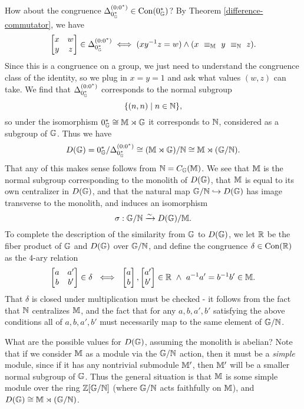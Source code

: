 \documentclass[letterpaper,11pt]{article}
\DeclareMathOperator{\Con}{Con}
\begin{document}
\begin{ex}
How about the congruence $\Delta_{0_\bG^*}^{(0:0^*)} \in \Con(0_\bG^*)$? By Theorem \ref{difference-commutator}, we have
\[
\begin{bmatrix} x & w\\ y & z\end{bmatrix} \in \Delta_{0_{\mathbb{G}}^*}^{(0:0^*)} \iff (xy^{-1}z = w) \wedge (x\ \equiv_{\mathbb{M}}\ y\ \equiv_{\mathbb{N}}\ z).
\]
Since this is a congruence on a group, we just need to understand the congruence class of the identity, so we plug in $x = y = 1$ and ask what values $(w,z)$ can take. We find that $\Delta_{0_{\mathbb{G}}^*}^{(0:0^*)}$ corresponds to the normal subgroup
\[
\{(n,n) \mid n \in \mathbb{N}\},
\]
so under the isomorphism $0_{\mathbb{G}}^* \cong \mathbb{M} \rtimes \mathbb{G}$ it corresponds to $\mathbb{N}$, considered as a subgroup of $\mathbb{G}$. Thus we have
\[
D(\mathbb{G}) = 0_{\mathbb{G}}^*/\Delta_{0_{\mathbb{G}}^*}^{(0:0^*)} \cong (\mathbb{M} \rtimes \mathbb{G})/\mathbb{N} \cong \mathbb{M} \rtimes (\mathbb{G}/\mathbb{N}).
\]
That any of this makes sense follows from $\mathbb{N} = C_{\mathbb{G}}(\mathbb{M})$. We see that $\mathbb{M}$ is the normal subgroup corresponding to the monolith of $D(\mathbb{G})$, that $\mathbb{M}$ is equal to its own centralizer in $D(\mathbb{G})$, and that the natural map $\mathbb{G}/\mathbb{N} \hookrightarrow D(\mathbb{G})$ has image transverse to the monolith, and induces an isomorphism
\[
\sigma : \mathbb{G}/\mathbb{N} \xrightarrow{\sim} D(\mathbb{G})/\mathbb{M}.
\]
To complete the description of the similarity from $\mathbb{G}$ to $D(\mathbb{G})$, we let $\mathbb{R}$ be the fiber product of $\mathbb{G}$ and $D(\mathbb{G})$ over $\mathbb{G}/\mathbb{N}$, and define the congruence $\delta \in \Con(\RR)$ as the $4$-ary relation
\[
\begin{bmatrix} a & a'\\ b & b'\end{bmatrix} \in \delta\ \iff\ \begin{bmatrix} a\\ b \end{bmatrix}, \begin{bmatrix} a'\\ b'\end{bmatrix} \in \RR\ \wedge\ a^{-1}a' = b^{-1}b' \in \bM.
\]
That $\delta$ is closed under multiplication must be checked - it follows from the fact that $\mathbb{N}$ centralizes $\mathbb{M}$, and the fact that for any $a,b,a',b'$ satisfying the above conditions all of $a,b,a',b'$ must necessarily map to the same element of $\mathbb{G}/\mathbb{N}$.

What are the possible values for $D(\mathbb{G})$, assuming the monolith is abelian? Note that if we consider $\mathbb{M}$ as a module via the $\mathbb{G}/\mathbb{N}$ action, then it must be a \emph{simple} module, since if it has any nontrivial submodule $\mathbb{M}'$, then $\mathbb{M}'$ will be a smaller normal subgroup of $\mathbb{G}$. Thus the general situation is that $\mathbb{M}$ is some simple module over the ring $\mathbb{Z}[\mathbb{G}/\mathbb{N}]$ (where $\mathbb{G}/\mathbb{N}$ acts faithfully on $\mathbb{M}$), and $D(\mathbb{G}) \cong \mathbb{M} \rtimes (\mathbb{G}/\mathbb{N})$.
\end{ex}
\end{document}
